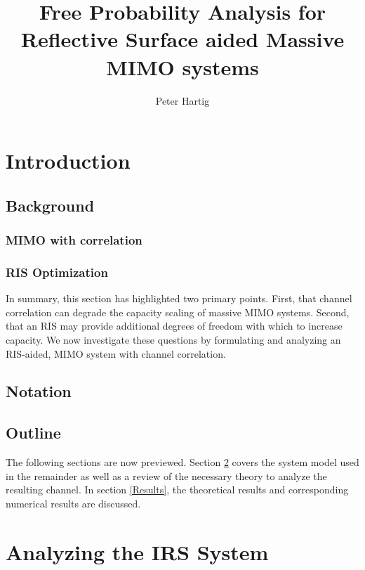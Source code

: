 \documentclass[12pt,a4paper]{report}
\title{Free Probability Analysis for Reflective Surface aided Massive MIMO systems}
\author{Peter Hartig}
\begin{document}
\maketitle
\begin{abstract}

\end{abstract}
%
\tableofcontents
\chapter{Introduction}
\section{Background}\label{Background}

\par
\subsection{MIMO with correlation}\label{mimo_corr}

\par
\subsection{RIS Optimization}\label{irs_opt}

\par
In summary, this section has highlighted two primary points. First, that channel correlation can degrade the capacity scaling of massive MIMO systems. Second, that an RIS may provide additional degrees of freedom with which to increase capacity. We now investigate these questions by formulating and analyzing an RIS-aided, MIMO system with channel correlation. 
\section{Notation}

\section{Outline}
The following sections are now previewed. Section \ref{system_model} covers the system model used in the remainder as well as a review of the necessary theory to analyze the resulting channel. In section \ref{Results}, the theoretical results and corresponding numerical results are discussed. 

\chapter{Analyzing the IRS System}\label{system_model}
\end{document}
